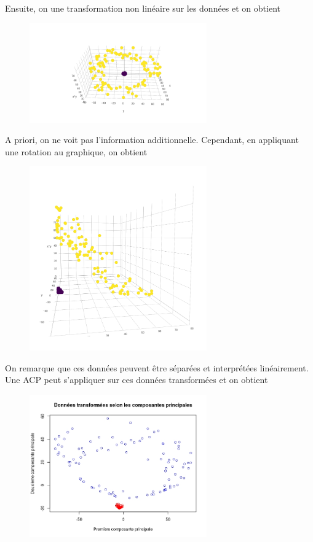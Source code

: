 Ensuite, on une transformation non linéaire sur les données et on obtient 

\begin{figure}[H]
	\includegraphics[width=3in]{exemple_1_2d}
\end{figure}

A priori, on ne voit pas l'information additionnelle. Cependant, en appliquant une rotation au graphique, on obtient

\begin{figure}[H]
	\includegraphics[width=3in]{exemple_1_3d}
\end{figure}

On remarque que ces données peuvent être séparées et interprétées linéairement. Une ACP peut s'appliquer sur ces données transformées et on obtient 

\begin{figure}[H]
	\includegraphics[width=3in]{exemple_1_pca}
\end{figure}

